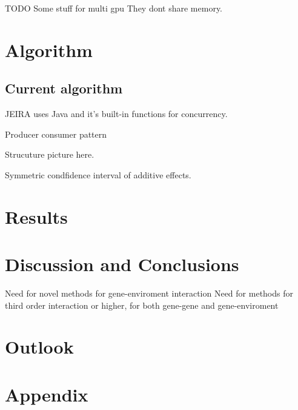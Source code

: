 \documentclass[10pt,a4paper]{article}
\begin{document}
TODO
Some stuff for multi gpu
They dont share memory.

\clearpage
\section{Algorithm}







\subsection{Current algorithm}
JEIRA uses Java and it's built-in functions for concurrency.

Producer consumer pattern

Strucuture picture here.

Symmetric condfidence interval of additive effects.


\section{Results}


\section{Discussion and Conclusions}
Need for novel methods for gene-enviroment interaction
Need for methods for third order interaction or higher, for both gene-gene and gene-enviroment

\section{Outlook}

\section{Appendix}


\newpage


\end{document}
